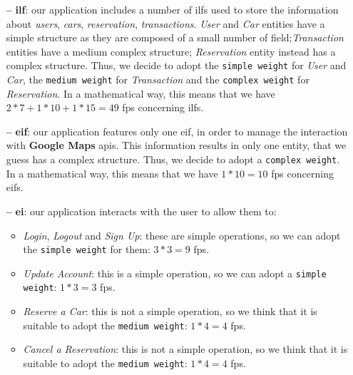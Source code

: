 \begin{itemize}

\item[\textbf{--}] \textbf{\acl{ilf}}: our application includes a number of \acs{ilf}s used to store the information about \textit{users}, \textit{cars}, \textit{reservation}, \textit{transactions}. \textit{User} and \textit{Car} entities have a simple structure as they are composed of a small number of field;\textit{Transaction} entities have a medium complex structure; \textit{Reservation} entity instead has a complex structure. Thus, we decide to adopt the \texttt{simple weight} for \textit{User} and \textit{Car}, the \texttt{medium weight} for \textit{Transaction} and the \texttt{complex weight} for \textit{Reservation}.
In a mathematical way, this means that we have $2 * 7 + 1 * 10 + 1 * 15 = 49$ \acs{fp}s concerning \acs{ilf}s.

\item[\textbf{--}] \textbf{\acl{eif}}: our application features only one \acs{eif}, in order to manage the interaction with \textbf{Google Maps} \acs{api}s. This information results in only one entity, that we guess has a complex structure. Thus, we decide to adopt a \texttt{complex weight}. 
In a mathematical way, this means that we have $1 * 10 = 10$ \acs{fp}s concerning \acs{eif}s.

\item[\textbf{--}] \textbf{\acl{ei}}: our application interacts with the user to allow them to:
	\begin{itemize}

	\item \textit{Login}, \textit{Logout} and \textit{Sign Up}: these are simple operations, so we can adopt the \texttt{simple weight} for them: $3 * 3 = 9$ 	\acs{fp}s.
	
	\item \textit{Update Account}: this is a simple operation, so we can adopt a \texttt{simple weight}: $1 * 3 = 3$ \acs{fp}s.

	\item \textit{Reserve a Car}: this is not a simple operation, so we think that it is suitable to adopt the \texttt{medium weight}: $1 * 4 = 4$ \acs{fp}s.

	\item \textit{Cancel a Reservation}: this is not a simple operation, so we think that it is suitable to adopt the \texttt{medium weight}: $1 * 4 = 4$ \acs{fp}s.

\end{itemize}


\end{itemize}
